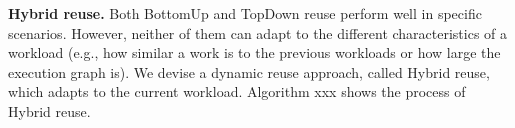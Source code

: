 \textbf{Hybrid reuse.}
Both BottomUp and TopDown reuse perform well in specific scenarios. 
However, neither of them can adapt to the different characteristics of a workload (e.g., how similar a work is to the previous workloads or how large the execution graph is).
We devise a dynamic reuse approach, called Hybrid reuse, which adapts to the current workload.
Algorithm xxx shows the process of Hybrid reuse.


%
%
